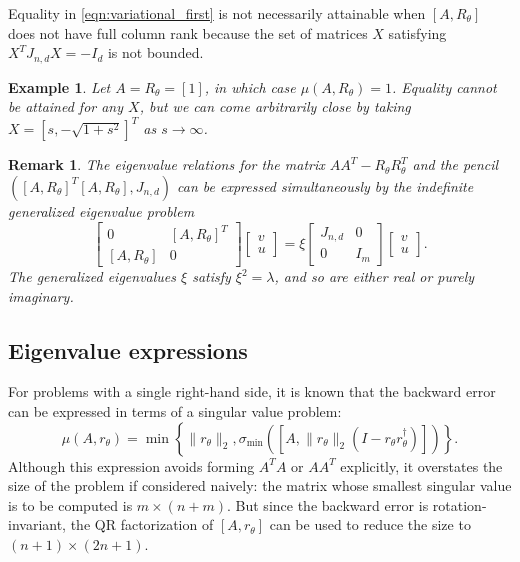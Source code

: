 \documentclass{article}
\newcommand{\ts}{^T}
\newtheorem{example}{Example}
\newtheorem{remark}{Remark}
\begin{document}
Equality in \cref{eqn:variational_first} is not necessarily attainable when $[A,R_\theta]$ does not have full column rank because the set of matrices $X$ satisfying $X\ts J_{n,d}X = -I_d$ is not bounded. 

\begin{example}
    Let $A = R_\theta = [1]$, 
    in which case $\mu(A,R_\theta) = 1$. Equality cannot be attained for any $X$, but we can come arbitrarily close by taking $X=[s,-\sqrt{1+s^2}]\ts$ as $s\rightarrow \infty$.
\end{example}

\begin{remark}
    The eigenvalue relations for the matrix $AA\ts - R_\theta R_\theta \ts$ and the pencil $([A,R_\theta]\ts[A,R_\theta], J_{n,d})$ can be expressed simultaneously by the indefinite generalized eigenvalue problem
    \begin{equation*}
        \begin{bmatrix}
            0 & [A,R_\theta]\ts \\
            [A,R_\theta] & 0
        \end{bmatrix}\begin{bmatrix}
            v \\ u
        \end{bmatrix} = \xi \begin{bmatrix}
            J_{n,d} & 0 \\ 0 & I_m
        \end{bmatrix}\begin{bmatrix}
            v \\ u
        \end{bmatrix}.
    \end{equation*}
    The generalized eigenvalues $\xi$ satisfy $\xi^2=\lambda$, and so are either real or purely imaginary.
\end{remark}

\subsection{Eigenvalue expressions}
For problems with a single right-hand side, it is known \cite[(2.15)]{walden1995optimal} that the backward error can be expressed in terms of a singular value problem: 
\begin{equation*}
    \mu(A, r_\theta) = \min\left\{\|r_\theta\|_2, \sigma_{\min}\left(\left[A, \|r_\theta\|_2(I-r_\theta r_\theta^\dagger)\right]\right)\right\}.
\end{equation*}
Although this expression avoids forming $A\ts A$ or $AA\ts$ explicitly, it overstates the size of the problem if considered naively: the matrix whose smallest singular value is to be computed is $m\times (n+m)$. But since the backward error is rotation-invariant, the QR factorization of $[A,r_\theta]$ can be used to reduce the size to $(n+1)\times (2n+1)$. 
\end{document}
